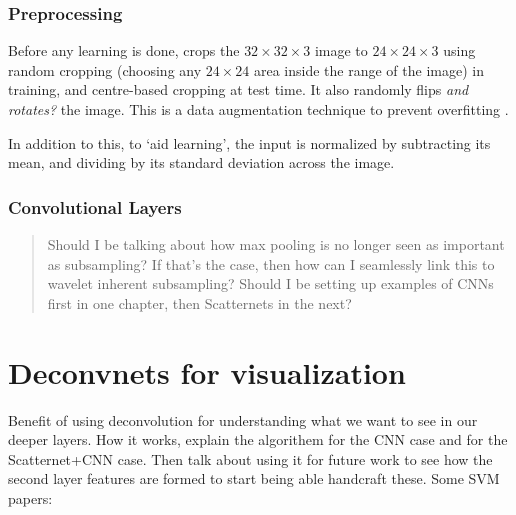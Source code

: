 \subsubsection{Preprocessing}
Before any learning is done, \lenet crops the $32\times 32 \times 3$ image to
$24 \times 24 \times 3$ using random cropping (choosing any $24 \times 24$ area
inside the range of the image) in training, and centre-based cropping at test
time. It also randomly flips \emph{and rotates?} the image. This is a data
augmentation technique to prevent overfitting \cite{data_augmentation}. 

In addition to this, to `aid learning', the input is normalized by subtracting its
mean, and dividing by its standard deviation across the image.

\subsubsection{Convolutional Layers}


\begin{quote}
Should I be talking about how max pooling is no longer seen as important as
subsampling? If that's the case, then how can I seamlessly link this to wavelet
inherent subsampling? Should I be setting up examples of CNNs first in one
chapter, then Scatternets in the next?
\end{quote}
 
\section{Deconvnets for visualization}
Benefit of using deconvolution for understanding what we want to see in our
deeper layers. How it works, explain the algorithem for the CNN case and for
the Scatternet+CNN case. Then talk about using it for future work to see how
the second layer features are formed to start being able handcraft these.
Some SVM papers:

